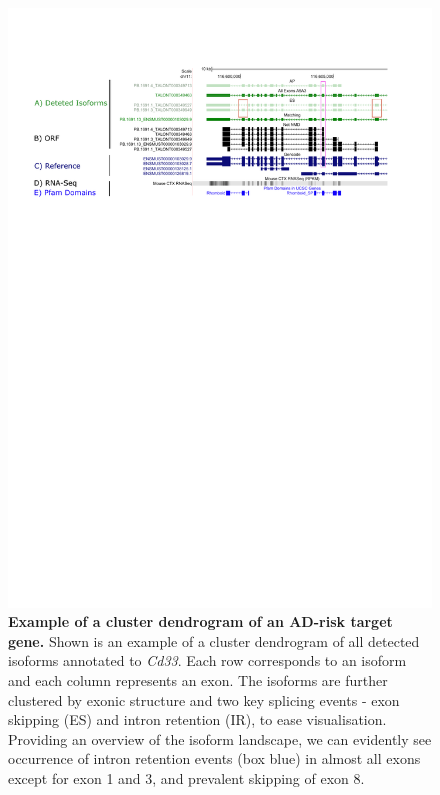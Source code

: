 \begin{figure}[htp]
	\centering
	\includegraphics[page=2,trim={1cm 15cm 0 2cm},scale = 0.85]{Figures/ExamplePlots.pdf}
	\captionsetup{width=0.95\textwidth, singlelinecheck=off}
	\caption[Example of a cluster dendrogram of an AD-risk target gene]%
	{\textbf{Example of a cluster dendrogram of an AD-risk target gene.} Shown is an example of a cluster dendrogram of all detected isoforms annotated to \textit{Cd33}. Each row corresponds to an isoform and each column represents an exon. The isoforms are further clustered by exonic structure and two key splicing events - exon skipping (ES) and intron retention (IR), to ease visualisation. Providing an overview of the isoform landscape, we can evidently see occurrence of intron retention events (box blue) in almost all exons except for exon 1 and 3, and prevalent skipping of exon 8. 
	}   
	\label{fig:eg_heatmap}
\end{figure}

